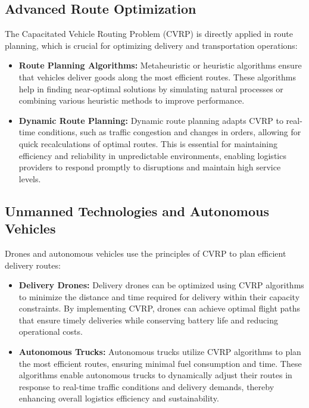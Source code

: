 \documentclass{article}
\begin{document}
    \subsection{Advanced Route Optimization}

    The Capacitated Vehicle Routing Problem (CVRP) is directly applied in route planning, which is crucial for optimizing delivery and transportation operations:

    \begin{itemize}
        \item \textbf{Route Planning Algorithms:} Metaheuristic or heuristic algorithms ensure that vehicles deliver goods along the most efficient routes. These algorithms help in finding near-optimal solutions by simulating natural processes or combining various heuristic methods to improve performance. \cite{Ochelska2021}
        \item \textbf{Dynamic Route Planning:} Dynamic route planning adapts CVRP to real-time conditions, such as traffic congestion and changes in orders, allowing for quick recalculations of optimal routes. This is essential for maintaining efficiency and reliability in unpredictable environments, enabling logistics providers to respond promptly to disruptions and maintain high service levels. \cite{Patel2024}
    \end{itemize}

    \subsection{Unmanned Technologies and Autonomous Vehicles}\label{sec:unmanned-technologies-and-autonomous-vehicles}

    Drones and autonomous vehicles use the principles of CVRP to plan efficient delivery routes:

    \begin{itemize}
        \item \textbf{Delivery Drones:} Delivery drones can be optimized using CVRP algorithms to minimize the distance and time required for delivery within their capacity constraints. By implementing CVRP, drones can achieve optimal flight paths that ensure timely deliveries while conserving battery life and reducing operational costs. \cite{murray2015}
        \item \textbf{Autonomous Trucks:} Autonomous trucks utilize CVRP algorithms to plan the most efficient routes, ensuring minimal fuel consumption and time. These algorithms enable autonomous trucks to dynamically adjust their routes in response to real-time traffic conditions and delivery demands, thereby enhancing overall logistics efficiency and sustainability. \cite{toth2014vehicle}
    \end{itemize}
\end{document}
